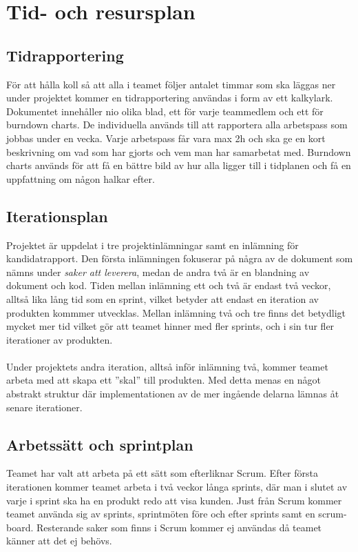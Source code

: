 \section{Tid- och resursplan}

\subsection{Tidrapportering}
För att hålla koll så att alla i teamet följer antalet timmar som ska läggas ner under
projektet kommer en tidrapportering\cite{bib-tidsrapportering} användas i form av ett 
kalkylark. Dokumentet innehåller nio olika blad, ett för varje teammedlem och ett för 
burndown charts. De individuella används till att rapportera alla arbetspass som jobbas under 
en vecka. Varje arbetspass får vara max 2h och ska ge en kort beskrivning om vad som har gjorts 
och vem man har samarbetat med. Burndown charts används för att få en bättre bild av hur alla
ligger till i tidplanen och få en uppfattning om någon halkar efter.


\subsection{Iterationsplan}
Projektet är uppdelat i tre projektinlämningar samt en inlämning för kandidatrapport. Den första inlämningen fokuserar
på några av de dokument som nämns under \textit{saker att leverera}, medan de andra två är en blandning av dokument och kod. Tiden mellan inlämning ett och två är endast två veckor, alltså lika lång tid som en sprint, vilket betyder att endast en iteration av produkten kommmer utvecklas. Mellan inlämning två och tre finns det betydligt mycket mer tid vilket gör att teamet hinner med fler sprints, och i sin tur fler iterationer av produkten.\\
\\
Under projektets andra iteration, alltså inför inlämning två, kommer teamet arbeta med att skapa ett ''skal'' till produkten. Med detta menas en något abstrakt struktur där implementationen av de mer ingående delarna lämnas åt senare iterationer.

\subsection{Arbetssätt och sprintplan}
Teamet har valt att arbeta på ett sätt som efterliknar Scrum. Efter första iterationen kommer teamet arbeta i två veckor långa sprints, där man i slutet av varje i sprint ska ha en produkt redo att visa kunden. Just från Scrum kommer teamet använda sig av sprints, sprintmöten före och efter sprints samt en scrum-board. Resterande saker som finns i Scrum kommer ej användas då teamet känner att det ej behövs.

